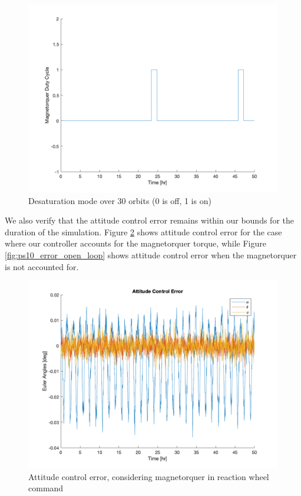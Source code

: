 \begin{figure}[H]
\centering
\includegraphics[scale=0.3]{Images/ps10_desaturation_mode.png}
\caption{Desaturation mode over 30 orbits (0 is off, 1 is on)}
\label{fig:ps10_desaturation_mode}
\end{figure}

We also verify that the attitude control error remains within our bounds for the duration of the simulation. Figure \ref{fig:ps10_error_closed_loop} shows attitude control error for the case where our controller accounts for the magnetorquer torque, while Figure \ref{fig:ps10_error_open_loop} shows attitude control error when the magnetorquer is not accounted for.

\begin{figure}[H]
\centering
\includegraphics[scale=0.3]{Images/ps10_error_closed_loop.png}
\caption{Attitude control error, considering magnetorquer in reaction wheel command}
\label{fig:ps10_error_closed_loop}
\end{figure}

